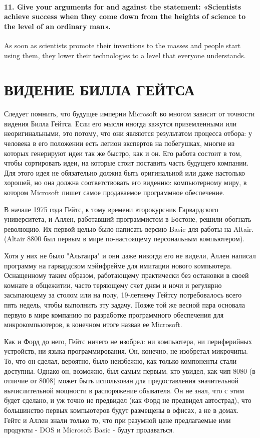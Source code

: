 \documentclass[a5paper, 12pt, twoside]{extreport}
\begin{document}
    \paragraph{11. Give your arguments for and against the statement: «Scientists achieve success when they come down from the heights of science to the level of an ordinary man».}
    As soon as scientists promote their inventions to the masses and people start using them, they lower their technologies to a level that everyone understands.






\section*{\normalsize ВИДЕНИЕ БИЛЛА ГЕЙТСА}
Следует помнить, что будущее империи Microsoft во многом зависит от точности видения Билла Гейтса. Если его мысли иногда кажутся приземленными или неоригинальными, это потому, что они являются результатом процесса отбора: у человека в его положении есть легион экспертов на побегушках, многие из которых генерируют идеи так же быстро, как и он. Его работа состоит в том, чтобы сортировать идеи, на которые стоит поставить часть будущего компании. Для этого идея не обязательно должна быть оригинальной или даже настолько хорошей, но она должна соответствовать его видению: компьютерному миру, в котором Microsoft пишет самое продаваемое программное обеспечение.


В начале 1975 года Гейтс, к тому времени второкурсник Гарвардского университета, и Аллен, работавший программистом в Бостоне, решили обогнать революцию. Их первой целью было написать версию Basic для работы на Altair. (Altair 8800 был первым в мире по-настоящему персональным компьютером).


Хотя у них не было "Альтаира" \- и они даже никогда его не видели, \- Аллен написал программу на гарвардском мэйнфрейме для имитации нового компьютера. Оснащенному таким образом, работающему практически без остановки в своей комнате в общежитии, часто теряющему счет дням и ночи и регулярно засыпающему за столом или на полу, 19-летнему Гейтсу потребовалось всего пять недель, чтобы выполнить эту задачу. Позже той же весной пара основала первую в мире компанию по разработке программного обеспечения для микрокомпьютеров, в конечном итоге назвав ее Microsoft.


Как и Форд до него, Гейтс ничего не изобрел: ни компьютера, ни периферийных устройств, ни языка программирования. Он, конечно, не изобретал микрочипы. То, что он сделал, вероятно, было неизбежно, как только компоненты стали доступны. Однако он, возможно, был самым первым, кто увидел, как чип 8080 (в отличие от 8008) может быть использован для предоставления значительной вычислительной мощности в распоряжение обывателя. Он не знал, что с этим будет сделано, и уж точно не предвидел (как Форд не предвидел автострад), что большинство первых компьютеров будут размещены в офисах, а не в домах. Гейтс и Аллен знали только то, что при разумной цене предлагаемые ими продукты - DOS и Microsoft Basic - будут продаваться.
\end{document}
